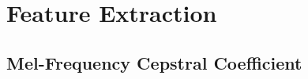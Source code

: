 \documentclass[12pt, a4paper, twoside]{report}
\begin{document}

\chapter{Feature Extraction}
\section{Mel-Frequency Cepstral Coefficient}
\end{document}
